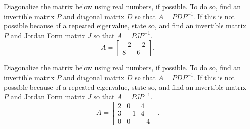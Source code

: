 \documentclass{ximera}
\begin{document}
\begin{exercise}%
    Diagonalize the matrix below using real numbers, if possible. To do so, find an invertible matrix $P$ and diagonal matrix $D$ so that $A = PDP^{-1}$. If this is not possible because of a repeated eigenvalue, state so, and find an invertible matrix $P$ and Jordan Form matrix $J$ so that $A = PJP^{-1}$. 
    \[ 
        A = 
        \begin{bmatrix} 
            -2 & -2 \\ 
            8 & 6 
        \end{bmatrix}.
    \]
\end{exercise} 

\begin{exercise}
    Diagonalize the matrix below using real numbers, if possible. To do so, find an invertible matrix $P$ and diagonal matrix $D$ so that $A = PDP^{-1}$. If this is not possible because of a repeated eigenvalue, state so, and find an invertible matrix $P$ and Jordan Form matrix $J$ so that $A = PJP^{-1}$. 
    \[ 
        A = 
        \begin{bmatrix} 
            2 &  0 &  4 \\ 
            3  &-1 & 4 \\ 
            0  & 0 &-4 
        \end{bmatrix}.
    \]
\end{exercise} 
\end{document}
